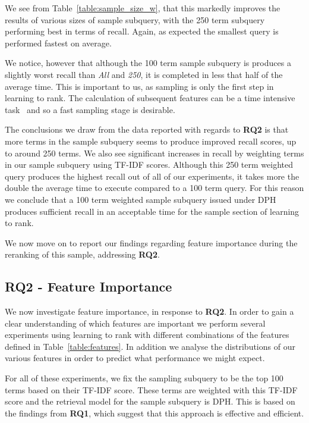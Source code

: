 \documentclass{mpaper}
\let\oldcite=\cite
\renewcommand\cite[1]{\ifthenelse{\equal{#1}{NEEDED}}{\ensuremath{^\texttt{[citation~needed]}}}{\oldcite{#1}}}
\begin{document}
We see from Table~\ref{table:sample_size_w}, that this markedly improves the results of various sizes of sample subquery, with the 250 term subquery performing best in terms of recall. Again, as expected the smallest query is performed fastest on average.

We notice, however that although the 100 term sample subquery is produces a slightly worst recall than \textit{All} and \textit{250}, it is completed in less that half of the average time. This is important to us, as sampling is only the first step in learning to rank.
The calculation of subsequent features can be a time intensive task~\cite{NEEDED} and so a fast sampling stage is desirable.

The conclusions we draw from the data reported with regards to \textbf{RQ2} is that more terms in the sample subquery seems to produce improved recall scores, up to around 250 terms. We also see significant increases in recall by weighting terms in our sample subquery using TF-IDF scores. Although this 250 term weighted query produces the highest recall out of all of our experiments, it takes more the double the average time to execute compared to a 100 term query.
For this reason we conclude that a 100 term weighted sample subquery issued under DPH produces sufficient recall in an acceptable time for the sample section of learning to rank.

We now move on to report our findings regarding feature importance during the reranking of this sample, addressing \textbf{RQ2}.

\subsection{RQ2 - Feature Importance} \label{sec:RQ2}
We now investigate feature importance, in response to \textbf{RQ2}. In order to gain a clear understanding of which features are important we perform several experiments using learning to rank with different combinations of the features defined in Table~\ref{table:features}.
In addition we analyse the distributions of our various features in order to predict what performance we might expect.

For all of these experiments, we fix the sampling subquery to be the top 100 terms based on their TF-IDF score. These terms are weighted with this TF-IDF score and the retrieval model for the sample subquery is DPH. This is based on the findings from \textbf{RQ1}, which suggest that this approach is effective and efficient.
\end{document}
